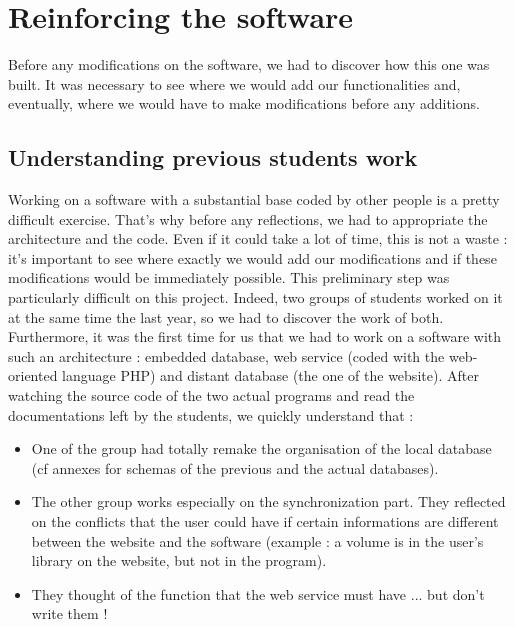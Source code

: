\documentclass[11pt]{report} %
\begin{document}
%
% 

\chapter{Reinforcing the software}
Before any modifications on the software, we had to discover how this one was built. It was necessary to see where we would add our functionalities and, eventually, where we would have to make modifications before any additions.

\section{Understanding previous students work}
Working on a software with a substantial base coded by other people is a pretty difficult exercise. That's why before any reflections, we had to appropriate the architecture and the code. Even if it could take a lot of time, this is not a waste : it's important to see where exactly we would add our modifications and if these modifications would be immediately possible. \newline
This preliminary step was particularly difficult on this project. Indeed, two groups of students worked on it at the same time the last year, so we had to discover the work of both. Furthermore, it was the first time for us that we had to work on a software with such an architecture : embedded database, web service (coded with the web-oriented language PHP) and distant database (the one of the website).\newline
After watching the source code of the two actual programs and read the documentations left by the students, we quickly understand that :

\begin{itemize}
\item One of the group had totally remake the organisation of the local database (cf annexes for schemas of the previous and the actual databases).
\item The other group works especially on the synchronization part. They reflected on the conflicts that the user could have if certain informations are different between the website and the software (example : a volume is in the user's library on the website, but not in the program).
\item They thought of the function that the web service must have ... but don't write them !
\end{itemize}
\end{document}
